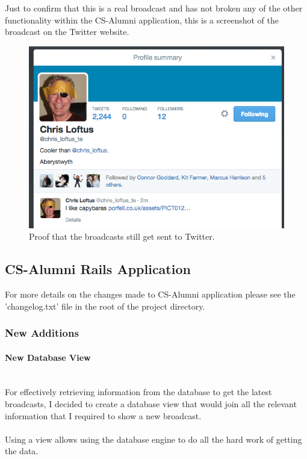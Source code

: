 \documentclass{article}
\newcommand{\myparagraph}[1]{\paragraph{#1}\mbox{}\\}
\begin{document}
\newpage
Just to confirm that this is a real broadcast and has not broken any of the other functionality within the CS-Alumni application, this is a screenshot of the broadcast on the Twitter website.

\begin{figure}[H]
\centering
\includegraphics[width=\textwidth]{twitterbc}
\caption{Proof that the broadcasts still get sent to Twitter.}
\end{figure}

\subsection{CS-Alumni Rails Application}

For more details on the changes made to CS-Alumni application please see the 'changelog.txt' file in the root of the project directory.

\subsubsection{New Additions}

\myparagraph{New Database View}
For effectively retrieving information from the database to get the latest broadcasts, I decided to create a database view that would join all the relevant information that I required to show a new broadcast.\\
\\
Using a view allows using the database engine to do all the hard work of getting the data.
\end{document}
